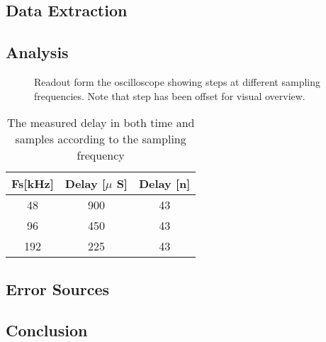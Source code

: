 \subsection{Data Extraction}

\subsection{Analysis}

\begin{figure}[H]
	\centering
	
	\caption{Readout form the oscilloscope showing steps at different sampling frequencies. Note that step has been offset for visual overview.}
	\label{fig:SchematicDelayExperiment}
\end{figure}


\begin{table}[H]
	\centering
	\begin{tabular}{ccc}
		Fs[kHz] & Delay [$\mu$ S] & Delay [n] \\ \hline \hline
		48 & 900 & 43 \\ 
		96 & 450 & 43 \\ 
		192 & 225 & 43
	\end{tabular} 
	\caption{The measured delay in both time and samples according to the sampling frequency}
	\label{tab:DelayResults}
\end{table}





\subsection{Error Sources}

\subsection{Conclusion}
